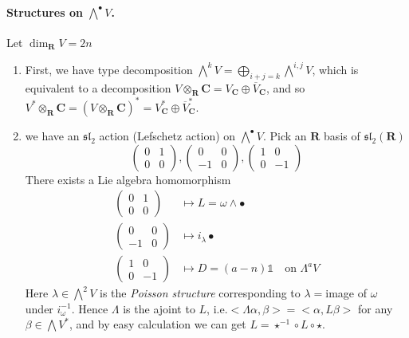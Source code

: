 \documentclass[
11pt, %
letterpaper， %
oneside, %
headinclude,footinclude, %
BCOR5mm, %
]{scrartcl}
\newcommand{\R}{{\mathbf{R}}}
\newcommand{\C}{{\mathbf{C}}}
\newcommand{\its}{\textit}
\begin{document}
\paragraph{Structures on $\bigwedge^{\bullet}V$.}
Let $\dim_{\R}V=2n$
\begin{enumerate}
	\item First, we have type decomposition $\bigwedge^{k}V=\bigoplus_{i+j=k}\bigwedge^{i,j}V$, which is equivalent to a decomposition $V\otimes_{\R}\C=V_{\C}\oplus \overline{V}_{\C}$, and so $V^*\otimes_{\R}\C=(V\otimes_{\R}\C)^*=V_{\C}^*\oplus \overline{V}_{\C}^*$.
	\item we have an $\mathfrak{sl}_2$ action (Lefschetz action) on $\bigwedge^{\bullet}V$.
	Pick an $\R$ basis of $\mathfrak{sl}_2(\R)$
	\begin{equation*}
	\begin{pmatrix} 0 & 1\\ 0 & 0 \end{pmatrix}, \begin{pmatrix} 0 & 0\\ -1 & 0 \end{pmatrix}, \begin{pmatrix} 1 & 0\\ 0 & -1 \end{pmatrix} 
	\end{equation*}
	There exists a Lie algebra homomorphism
	\begin{align*}
	\begin{pmatrix} 0 & 1\\ 0 & 0 \end{pmatrix} &\mapsto L=\omega \wedge \bullet \\
	\begin{pmatrix} 0 & 0\\ -1 & 0 \end{pmatrix} & \mapsto i_{\lambda}\bullet\\
	\begin{pmatrix} 1 & 0\\ 0 & -1 \end{pmatrix} &\mapsto D=	(a-n)\mathbb{1}\quad \text{on $\Lambda^a V$}
	\end{align*}
	Here $\lambda \in \bigwedge^2 V$ is the \its{Poisson structure } corresponding to $\lambda=$image of $\omega$ under $i_{\omega}^{-1}$. Hence $\Lambda$ is the ajoint to $L$, i.e.$<\Lambda \alpha, \beta>=<\alpha, L \beta>$ for any $\beta \in \bigwedge V^*$, and by easy calculation we can get $L=\star^{-1}\circ L \circ \star$.
	\begin{exercise}
		\
		

\end{exercise}
\end{enumerate}
\end{document}
